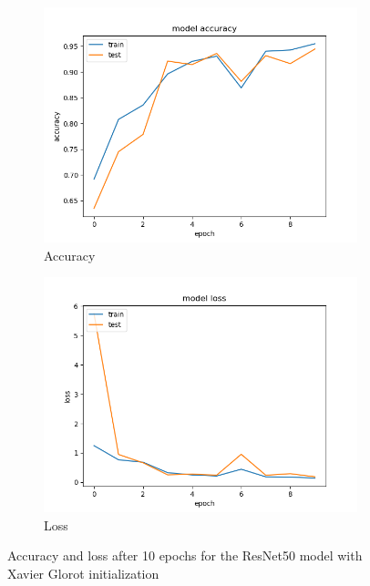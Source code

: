 \documentclass{article}
\theoremstyle{definition}
\theoremstyle{remark}
\begin{document}
\begin{figure}[h!]
\centering
\begin{subfigure}{.5\textwidth}
  \centering
  \includegraphics[width=1.2\linewidth]{img/from_scratch_models/ResNet50_acc.png}
  \caption{Accuracy}
  \label{fig:sub1}
\end{subfigure}%
\begin{subfigure}{.5\textwidth}
  \centering
  \includegraphics[width=1.2\linewidth]{img/from_scratch_models/ResNet50_loss.png}
  \caption{Loss}
  \label{fig:sub2}
\end{subfigure}
\caption{Accuracy and loss after 10 epochs for the ResNet50 model with Xavier Glorot initialization}
\label{fig:resnet50_ten_epochs_xavier}
\end{figure}
\end{document}
